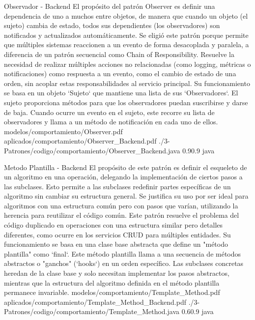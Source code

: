 \Patron
    {Observador - Backend}
    {El propósito del patrón Observer es definir una dependencia de uno a muchos entre objetos, de manera que cuando un objeto (el sujeto) cambia de estado, todos sus dependientes (los observadores) son notificados y actualizados automáticamente. Se eligió este patrón porque permite que múltiples sistemas reaccionen a un evento de forma desacoplada y paralela, a diferencia de un patrón secuencial como Chain of Responsibility.}
    {Resuelve la necesidad de realizar múltiples acciones no relacionadas (como logging, métricas o notificaciones) como respuesta a un evento, como el cambio de estado de una orden, sin acoplar estas responsabilidades al servicio principal. Su funcionamiento se basa en un objeto `Sujeto` que mantiene una lista de sus `Observadores`. El sujeto proporciona métodos para que los observadores puedan suscribirse y darse de baja. Cuando ocurre un evento en el sujeto, este recorre su lista de observadores y llama a un método de notificación en cada uno de ellos.}
    {modelos/comportamiento/Observer.pdf}
    {aplicados/comportamiento/Observer_Backend.pdf}
    {./3-Patrones/codigo/comportamiento/Observer_Backend.java}
    {0.9}{0.9}
    {java}
\newpage

\Patron
    {Metodo Plantilla - Backend}
    {El propósito de este patrón es definir el esqueleto de un algoritmo en una operación, delegando la implementación de ciertos pasos a las subclases. Esto permite a las subclases redefinir partes específicas de un algoritmo sin cambiar su estructura general. Se justifica su uso por ser ideal para algoritmos con una estructura común pero con pasos que varían, utilizando la herencia para reutilizar el código común.}
    {Este patrón resuelve el problema del código duplicado en operaciones con una estructura similar pero detalles diferentes, como ocurre en los servicios CRUD para múltiples entidades. Su funcionamiento se basa en una clase base abstracta que define un "método plantilla" como `final`. Este método plantilla llama a una secuencia de métodos abstractos o "ganchos" (`hooks`) en un orden específico. Las subclases concretas heredan de la clase base y solo necesitan implementar los pasos abstractos, mientras que la estructura del algoritmo definida en el método plantilla permanece invariable.}
    {modelos/comportamiento/Template_Method.pdf}
    {aplicados/comportamiento/Template_Method_Backend.pdf}
    {./3-Patrones/codigo/comportamiento/Template_Method.java}
    {0.6}{0.9}
    {java}
\newpage

